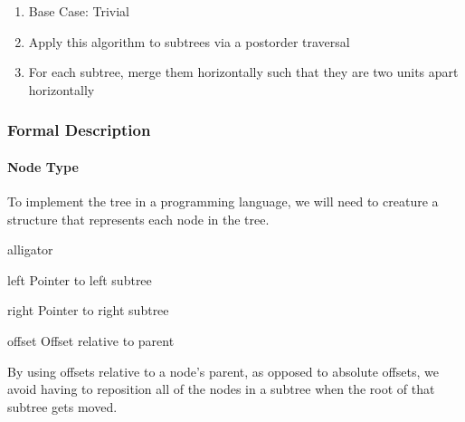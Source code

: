 \documentclass[11pt]{report}
\begin{document}
\begin{enumerate}
    \item Base Case: Trivial
    \item Apply this algorithm to subtrees via a postorder traversal
    \item For each subtree, merge them horizontally such that they are two units apart horizontally
\end{enumerate}

\subsubsection{Formal Description}
\paragraph{Node Type}
To implement the tree in a programming language, we will need to creature a structure that represents each node in the tree.
\begin{labeling}{alligator}
    \item [left] Pointer to left subtree
    \item [right] Pointer to right subtree
    \item [offset] Offset relative to parent
\end{labeling}

By using offsets relative to a node's parent, as opposed to absolute offsets, we avoid having to reposition all of the nodes in a subtree when the root of that subtree gets moved.
\end{document}
